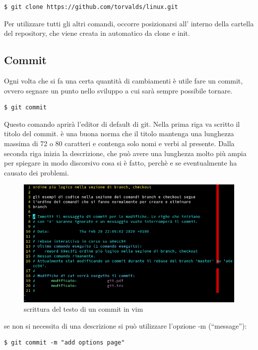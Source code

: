 \documentclass{article} \usepackage[textwidth=18cm,textheight=18cm]{geometry}
\begin{document}
\begin{verbatim}
$ git clone https://github.com/torvalds/linux.git
\end{verbatim}

Per utilizzare tutti gli altri comandi, occorre posizionarsi all' interno della
cartella del repository, che viene creata in automatico da clone e init.

\subsection{Commit}

Ogni volta che si fa una certa quantità di cambiamenti è utile fare un commit,
ovvero segnare un punto nello sviluppo a cui sarà sempre possibile tornare. 

\begin{verbatim}
$ git commit
\end{verbatim}

Questo comando aprirà l'editor di default di git. Nella prima riga va scritto il
titolo del commit. è una buona norma che il titolo mantenga una lunghezza
massima di 72 o 80 caratteri e contenga solo nomi e verbi al presente. Dalla
seconda riga inizia la descrizione, che può avere una lunghezza molto più ampia
per spiegare in modo discorsivo cosa si è fatto, perchè e se eventualmente ha
causato dei problemi.

\begin{figure}
\includegraphics[width=6in]{vimEditCommit.png}
\centering
\caption{scrittura del testo di un commit in vim}
\end{figure}

se non si necessita di una descrizione si può utilizzare l'opzione -m
(``message''):

\begin{verbatim}
$ git commit -m "add options page"
\end{verbatim}
\end{document}
